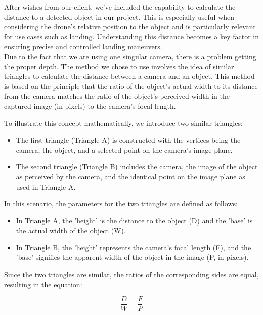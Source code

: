 After wishes from our client, we've included the capability to calculate the distance to a detected object in our project. This is especially useful when considering the drone's relative position to the object and is particularly relevant for use cases such as landing. Understanding this distance becomes a key factor in ensuring precise and controlled landing maneuvers. \\

Due to the fact that we are using one singular camera, there is a problem getting the proper depth. The method we chose to use involves the idea of similar triangles to calculate the distance between a camera and an object. This method is based on the principle that the ratio of the object's actual width to its distance from the camera matches the ratio of the object's perceived width in the captured image (in pixels) to the camera's focal length. \cite{distanceobject}

To illustrate this concept mathematically, we introduce two similar triangles:

\begin{itemize}
    \item The first triangle (Triangle A) is constructed with the vertices being the camera, the object, and a selected point on the camera's image plane.
    \item The second triangle (Triangle B) includes the camera, the image of the object as perceived by the camera, and the identical point on the image plane as used in Triangle A.
\end{itemize}

In this scenario, the parameters for the two triangles are defined as follows:

\begin{itemize}
    \item In Triangle A, the 'height' is the distance to the object (D) and the 'base' is the actual width of the object (W).
    \item In Triangle B, the 'height' represents the camera's focal length (F), and the 'base' signifies the apparent width of the object in the image (P, in pixels).
\end{itemize}

Since the two triangles are similar, the ratios of the corresponding sides are equal, resulting in the equation:

\begin{equation}
\frac{D}{W} = \frac{F}{P}
\end{equation}

